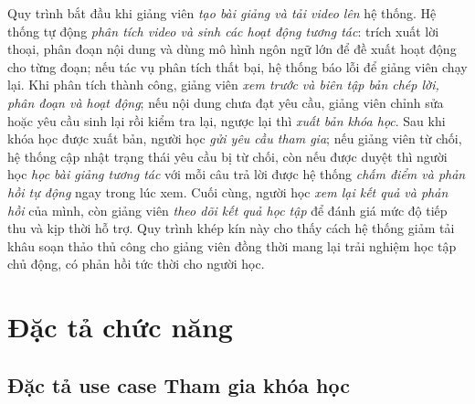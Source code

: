 \documentclass[../DoAn.tex]{subfiles}
\begin{document}
Quy trình bắt đầu khi giảng viên \emph{tạo bài giảng và tải video lên} hệ thống. Hệ thống tự động \emph{phân tích video và sinh các hoạt động tương tác}: trích xuất lời thoại, phân đoạn nội dung và dùng mô hình ngôn ngữ lớn để đề xuất hoạt động cho từng đoạn; nếu tác vụ phân tích thất bại, hệ thống báo lỗi để giảng viên chạy lại. Khi phân tích thành công, giảng viên \emph{xem trước và biên tập bản chép lời, phân đoạn và hoạt động}; nếu nội dung chưa đạt yêu cầu, giảng viên chỉnh sửa hoặc yêu cầu sinh lại rồi kiểm tra lại, ngược lại thì \emph{xuất bản khóa học}. Sau khi khóa học được xuất bản, người học \emph{gửi yêu cầu tham gia}; nếu giảng viên từ chối, hệ thống cập nhật trạng thái yêu cầu bị từ chối, còn nếu được duyệt thì người học \emph{học bài giảng tương tác} với mỗi câu trả lời được hệ thống \emph{chấm điểm và phản hồi tự động} ngay trong lúc xem. Cuối cùng, người học \emph{xem lại kết quả và phản hồi} của mình, còn giảng viên \emph{theo dõi kết quả học tập} để đánh giá mức độ tiếp thu và kịp thời hỗ trợ. Quy trình khép kín này cho thấy cách hệ thống giảm tải khâu soạn thảo thủ công cho giảng viên đồng thời mang lại trải nghiệm học tập chủ động, có phản hồi tức thời cho người học.
\section{Đặc tả chức năng}
\label{section:2.3}

\subsection{Đặc tả use case Tham gia khóa học}
\end{document}
